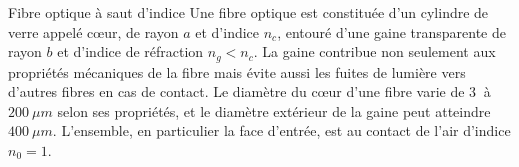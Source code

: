 \begin{exo}[PCSI]{Fibre optique à saut d'indice}%
Une fibre optique est constituée d'un cylindre de verre appelé c{\oe}ur, de rayon $a$ et d'indice $n_c$, entouré d'une gaine transparente de rayon $b$ et d'indice de réfraction $n_g<n_c$.
La gaine contribue non seulement aux propriétés mécaniques de la fibre mais évite aussi les fuites de lumière vers d'autres fibres en cas de contact.
Le diamètre du c{\oe}ur d'une fibre varie de $\SI{3}{}$ à $\SI{200}{\mu m}$ selon ses propriétés, et le diamètre extérieur de la gaine peut atteindre $\SI{400}{\mu m}$.
L'ensemble, en particulier la face d'entrée, est au contact de l'air d'indice $n_0=1$.


\end{exo}
